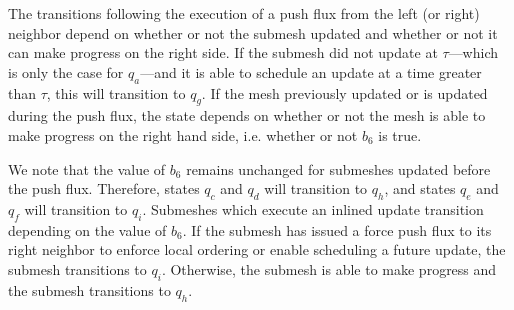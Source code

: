 The transitions following the execution of a push flux from the left (or right) neighbor depend on whether or not the submesh updated and whether or not it can make progress on the right side. If the submesh did not update at $\tau$---which is only the case for $q_a$---and it is able to schedule an update at a time greater than $\tau$, this will transition to $q_g$. If the mesh previously updated or is updated during the push flux, the state depends on whether or not the mesh is able to make progress on the right hand side, i.e. whether or not $b_6$ is true. 

We note that the value of $b_6$ remains unchanged for submeshes updated before the push flux. Therefore, states $q_c$ and $q_d$ will transition to $q_h$, and states $q_e$ and $q_f$ will transition to $q_i$. Submeshes which execute an inlined update transition depending on the value of $b_6$. If the submesh has issued a force push flux to its right neighbor to enforce local ordering or enable scheduling a future update, the submesh transitions to $q_i$. Otherwise, the submesh is able to make progress and the submesh transitions to $q_h$.

